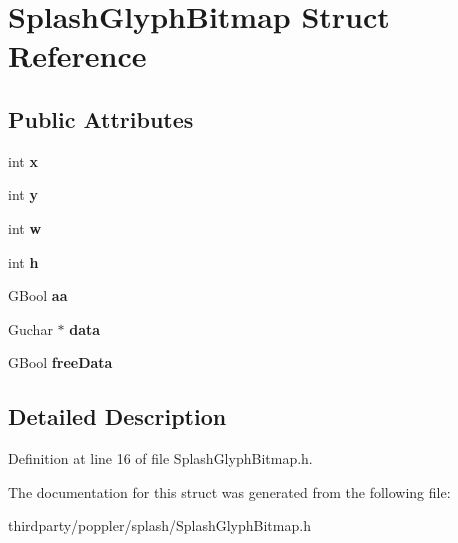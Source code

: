 \hypertarget{struct_splash_glyph_bitmap}{}\section{Splash\+Glyph\+Bitmap Struct Reference}
\label{struct_splash_glyph_bitmap}
\subsection*{Public Attributes}
\begin{DoxyCompactItemize}
\item 
\mbox{\label{struct_splash_glyph_bitmap_a38dbcd1fbe2fd64e3fe3ea75c6525d5f}} 
int {\bfseries x}
\item 
\mbox{\label{struct_splash_glyph_bitmap_a8dcd32d2f423d5126d0ffee4280ada68}} 
int {\bfseries y}
\item 
\mbox{\label{struct_splash_glyph_bitmap_a4efbf0eac5cfa72686ceb0f12a33343e}} 
int {\bfseries w}
\item 
\mbox{\label{struct_splash_glyph_bitmap_a6e1fbdbc4691d02e9895441ae4fa1405}} 
int {\bfseries h}
\item 
\mbox{\label{struct_splash_glyph_bitmap_ae9d6d1273266e27547af88c8b7f93792}} 
G\+Bool {\bfseries aa}
\item 
\mbox{\label{struct_splash_glyph_bitmap_a2fae082a0fa7e41b062d6d2f32288e95}} 
Guchar $\ast$ {\bfseries data}
\item 
\mbox{\label{struct_splash_glyph_bitmap_aa21200db170ae1f0de0e08dad3517578}} 
G\+Bool {\bfseries free\+Data}
\end{DoxyCompactItemize}


\subsection{Detailed Description}


Definition at line 16 of file Splash\+Glyph\+Bitmap.\+h.



The documentation for this struct was generated from the following file\+:\begin{DoxyCompactItemize}
\item 
thirdparty/poppler/splash/Splash\+Glyph\+Bitmap.\+h\end{DoxyCompactItemize}
